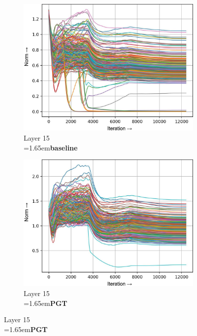 \documentclass[runningheads]{llncs}
\newcommand{\forceindentb}{\parindent=1.65em\indent\parindent=0pt\relax}
\begin{document}
\clearpage


\begin{figure}[h]
\centering

\begin{subfigure}[t]{0.34\textwidth}
\includegraphics[width=\textwidth]{trimmed/baseline-w-layer-5-3}
\caption{Layer 15\\ \forceindentb\textbf{baseline}}
\end{subfigure}
\begin{subfigure}[t]{0.34\textwidth}
\includegraphics[width=\textwidth]{trimmed/pgt-w-layer-5-3}
\caption{Layer 15\\ \forceindentb\textbf{PGT}}
\end{subfigure}


\end{figure}
\end{document}
